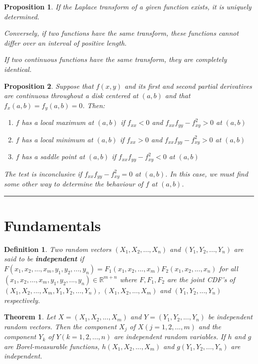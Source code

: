 \documentclass[14pt,twoside]{extreport}
\newcommand{\hhrule}{\vspace{1cm}\hrule\vspace{1cm}}
\theoremstyle{dotless}
\newtheorem*{defn}{\footnotesize Definition}
\newtheorem*{thm}{\footnotesize Theorem} %
\newtheorem*{prop}{\footnotesize Proposition} %
\begin{document}
\begin{prop}
    If the Laplace transform of a given function exists, it is uniquely determined.
    
    Conversely, if two functions have the same transform, these functions cannot differ over an interval of positive length.

    If two continuous functions have the same transform, they are completely identical.
\end{prop}

\begin{prop}
    Suppose that $f(x,y)$ and its first and second partial derivatives are continuous throughout a disk centered at $(a,b)$ and that $f_x(a,b) = f_y(a,b) = 0$. Then:
    \begin{enumerate}
        \item $f$ has a local maximum at $(a,b)$ if $f_{xx} < 0$ and $f_{xx}f_{yy} - f_{xy}^2 > 0$ at $(a,b)$
        \item $f$ has a local minimum at $(a,b)$ if $f_{xx} > 0$ and $f_{xx}f_{yy} - f_{xy}^2 > 0$ at $(a,b)$
        \item $f$ has a saddle point at $(a,b)$ if $f_{xx}f_{yy} - f_{xy}^2 < 0$ at $(a,b)$
    \end{enumerate}
    The test is inconclusive if $f_{xx}f_{yy} - f_{xy}^2 = 0$ at $(a,b)$. In this case, we must find some other way to determine the behaviour of $f$ at $(a,b)$.
\end{prop}

\hhrule
\section*{Fundamentals}

\begin{defn}
    Two random vectors $(X_1, X_2, ... , X_n)$ and $(Y_1, Y_2, ... , Y_n)$ are said to be \textbf{independent} if $F(x_1, x_2, ..., x_m, y_1, y_2, ..., y_n) = F_1 (x_1, x_2, ..., x_m) F_2 (x_1, x_2, ..., x_n)$ for all $(x_1, x_2, ..., x_m, y_1, y_2, ..., y_n) \in \mathbb{R}^{m+n}$ where $F, F_1, F_2$ are the joint CDF's of $(X_1, X_2, ..., X_m, Y_1, Y_2, ..., Y_n)$, $(X_1, X_2, ..., X_m)$ and $(Y_1, Y_2, ..., Y_n)$ respectively.
\end{defn}

\begin{thm}
    Let $X = (X_1, X_2, ... , X_m)$ and $Y = (Y_1, Y_2, ... , Y_n)$ be independent random vectors. Then the component $X_j$ of $X(j = 1, 2, ... , m)$ and the component $Y_k$ of $Y(k = 1, 2, ... , n)$ are independent random variables. If $h$ and $g$ are Borel-measurable functions, $h(X_1, X_2, ..., X_m)$ and $g(Y_1, Y_2, ... , Y_n)$ are independent.
\end{thm}
\end{document}
